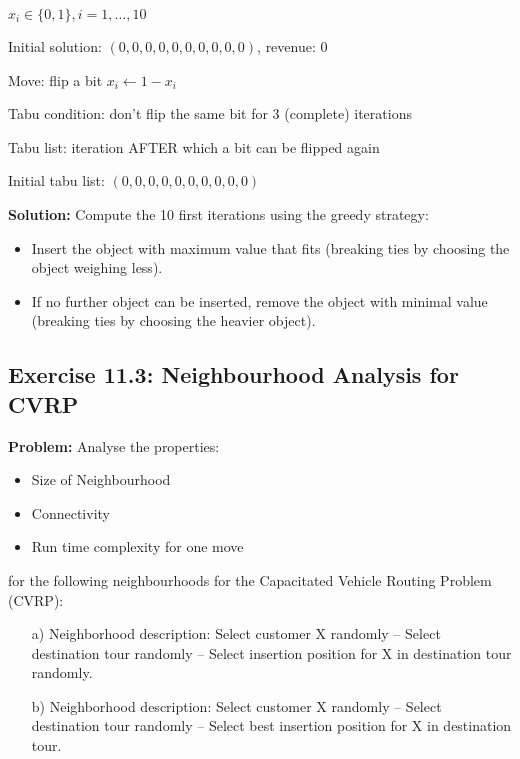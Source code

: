 \(x_i \in \{0,1\}, i = 1, \ldots, 10\)

Initial solution: \((0, 0, 0, 0, 0, 0, 0, 0, 0, 0)\), revenue: 0

Move: flip a bit \(x_i \leftarrow 1 - x_i\)

Tabu condition: don't flip the same bit for 3 (complete) iterations

Tabu list: iteration AFTER which a bit can be flipped again

Initial tabu list: \((0, 0, 0, 0, 0, 0, 0, 0, 0, 0)\)

\textbf{Solution:}
Compute the 10 first iterations using the greedy strategy:
\begin{itemize}
\item Insert the object with maximum value that fits (breaking ties by choosing the object weighing less).
\item If no further object can be inserted, remove the object with minimal value (breaking ties by choosing the heavier object).
\end{itemize}

\subsection{Exercise 11.3: Neighbourhood Analysis for CVRP}
\textbf{Problem:}
Analyse the properties:
\begin{itemize}
\item Size of Neighbourhood
\item Connectivity
\item Run time complexity for one move
\end{itemize}
for the following neighbourhoods for the Capacitated Vehicle Routing Problem (CVRP):

\begin{enumerate}
\item[a)] Neighborhood description: Select customer X randomly -- Select destination tour randomly -- Select insertion position for X in destination tour randomly.
\item[b)] Neighborhood description: Select customer X randomly -- Select destination tour randomly -- Select best insertion position for X in destination tour.
\end{enumerate}

